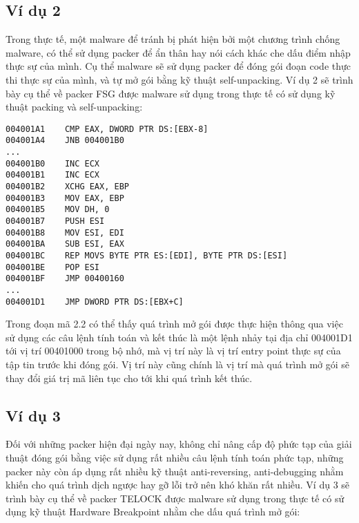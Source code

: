 \subsection{Ví dụ 2}

\hspace{0.5cm}Trong thực tế, một malware để tránh bị phát hiện bởi một chương trình chống malware, có thể sử dụng packer để ẩn thân hay nói cách khác che dấu điểm nhập thực sự của mình. Cụ thể malware sẽ sử dụng packer để đóng gói đoạn code thực thi thực sự của mình, và tự mở gói bằng kỹ thuật self-unpacking. Ví dụ 2 sẽ trình bày cụ thể về packer FSG được malware sử dụng trong thực tế có sử dụng kỹ thuật packing và self-unpacking:\\

\begin{code}
\begin{lstlisting}[captionpos=b,caption={Kỹ thuật Unpacking sử dụng trong packer FSG},frame=single]
004001A1	CMP EAX, DWORD PTR DS:[EBX-8]
004001A4	JNB 004001B0
...
004001B0	INC ECX
004001B1	INC ECX
004001B2	XCHG EAX, EBP
004001B3	MOV EAX, EBP
004001B5	MOV DH, 0
004001B7	PUSH ESI
004001B8	MOV ESI, EDI
004001BA	SUB ESI, EAX
004001BC	REP MOVS BYTE PTR ES:[EDI], BYTE PTR DS:[ESI]
004001BE	POP ESI
004001BF 	JMP 00400160		
...
004001D1	JMP DWORD PTR DS:[EBX+C]
\end{lstlisting}
\end{code} 

\hspace{0.5cm}Trong đoạn mã 2.2 có thể thấy quá trình mở gói được thực hiện thông qua việc sử dụng các câu lệnh tính toán và kết thúc là một lệnh nhảy tại địa chỉ 004001D1 tới vị trí 00401000 trong bộ nhớ, mà vị trí này là vị trí entry point thực sự của tập tin trước khi đóng gói. Vị trí này cũng chính là vị trí mà quá trình mở gói sẽ thay đổi giá trị mã liên tục cho tới khi quá trình kết thúc. 

\subsection{Ví dụ 3}

\hspace{0.5cm}Đối với những packer hiện đại ngày nay, không chỉ nâng cấp độ phức tạp của giải thuật đóng gói bằng việc sử dụng rất nhiều câu lệnh tính toán phức tạp, những packer này còn áp dụng rất nhiều kỹ thuật anti-reversing, anti-debugging nhằm khiến cho quá trình dịch ngược hay gỡ lỗi trở nên khó khăn rất nhiều. Ví dụ 3 sẽ trình bày cụ thể về packer TELOCK được malware sử dụng trong thực tế có sử dụng kỹ thuật Hardware Breakpoint nhằm che dấu quá trình mở gói:\\

